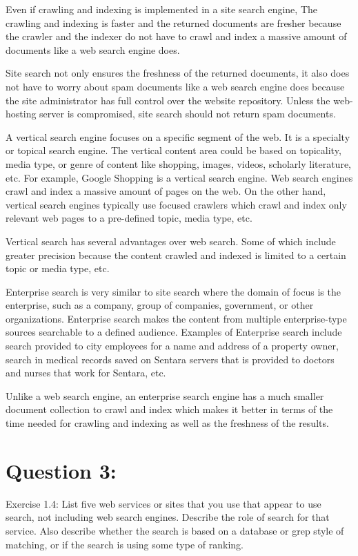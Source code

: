\documentclass[a4paper, 11pt]{article}
\begin{document}
Even if crawling and indexing is implemented in a site search engine, The crawling and indexing is faster and the returned documents are fresher because the crawler and the indexer do not have to crawl and index a massive amount of documents like a web search engine does.

Site search not only ensures the freshness of the returned documents, it also does not have to worry about spam documents like a web search engine does because the site administrator has full control over the website repository. Unless the web-hosting server is compromised, site search should not return spam documents.

A vertical search engine focuses on a specific segment of the web. It is a specialty or topical search engine. The vertical content area could be based on topicality, media type, or genre of content like shopping, images, videos, scholarly literature, etc. For example, Google Shopping is a vertical search engine. Web search engines crawl and index a massive amount of pages on the web. On the other hand, vertical search engines typically use focused crawlers which crawl and index only relevant web pages to a pre-defined topic, media type, etc.

Vertical search has several advantages over web search. Some of which include greater precision because the content crawled and indexed is limited to a certain topic or media type, etc.

Enterprise search is very similar to site search where the domain of focus is the enterprise, such as a company, group of companies, government, or other organizations. Enterprise search makes the content from multiple enterprise-type sources searchable to a defined audience. Examples of Enterprise search include search provided to city employees for a name and address of a property owner, search in medical records saved on Sentara servers  that is provided to doctors and nurses that work for Sentara, etc.

Unlike a web search engine, an enterprise search engine has a much smaller document collection to crawl and index which makes it better in terms of the time needed for crawling and indexing as well as the freshness of the results.

\section*{Question 3:}
Exercise 1.4: List five web services or sites that you use that appear to use search, not including
web search engines. Describe the role of search for that service. Also describe
whether the search is based on a database or grep style of matching, or if the search
is using some type of ranking.
\end{document}
